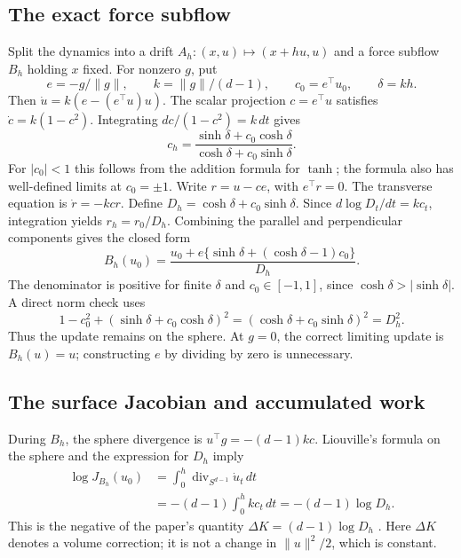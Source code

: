 \subsection{The exact force subflow}

Split the dynamics into a drift $A_h:(x,u)\mapsto(x+hu,u)$ and a force
subflow $B_h$ holding $x$ fixed. For nonzero $g$, put
\begin{equation}
 e=-g/\|g\|,\qquad k=\|g\|/(d-1),\qquad
 c_0=e^\top u_0,\qquad \delta=kh.
 \label{eq:bf-modern-force-definitions}
\end{equation}
Then $\dot u=k(e-(e^\top u)u)$. The scalar projection $c=e^\top u$
satisfies $\dot c=k(1-c^2)$. Integrating
$dc/(1-c^2)=k\,dt$ gives
\begin{equation}
 c_h=\frac{\sinh\delta+c_0\cosh\delta}
            {\cosh\delta+c_0\sinh\delta}.
 \label{eq:bf-modern-force-projection}
\end{equation}
For $|c_0|<1$ this follows from the addition formula for $\tanh$; the formula
also has well-defined limits at $c_0=\pm1$. Write $r=u-ce$, with $e^\top r=0$.
The transverse equation is $\dot r=-kc r$. Define
$D_h=\cosh\delta+c_0\sinh\delta$. Since
$d\log D_t/dt=kc_t$, integration yields $r_h=r_0/D_h$. Combining the
parallel and perpendicular components gives the closed form
\begin{equation}
 B_h(u_0)=
 \frac{u_0+e\{\sinh\delta+(\cosh\delta-1)c_0\}}
      {D_h}.
 \label{eq:bf-modern-force-map}
\end{equation}
The denominator is positive for finite $\delta$ and $c_0\in[-1,1]$, since
$\cosh\delta>|\sinh\delta|$. A direct norm check uses
\begin{equation}
 1-c_0^2+(\sinh\delta+c_0\cosh\delta)^2
       =(\cosh\delta+c_0\sinh\delta)^2=D_h^2.
 \label{eq:bf-modern-force-norm-identity}
\end{equation}
Thus the update remains on the sphere. At $g=0$, the correct limiting update
is $B_h(u)=u$; constructing $e$ by dividing by zero is unnecessary.

\subsection{The surface Jacobian and accumulated work}

During $B_h$, the sphere divergence is
$u^\top g=-(d-1)kc$. Liouville's formula on the sphere and the expression
for $D_h$ imply
\begin{align}
 \log J_{B_h}(u_0)
 &=\int_0^h\operatorname{div}_{S^{d-1}}\dot u_t\,dt\\
 &=-(d-1)\int_0^h kc_t\,dt
   =-(d-1)\log D_h.
 \label{eq:bf-modern-force-jacobian}
\end{align}
This is the negative of the paper's quantity
$\Delta K=(d-1)\log D_h$ \citep[equation (8)]{robnik2025mams}. Here
$\Delta K$ denotes a volume correction; it is not a change in
$\|u\|^2/2$, which is constant.

